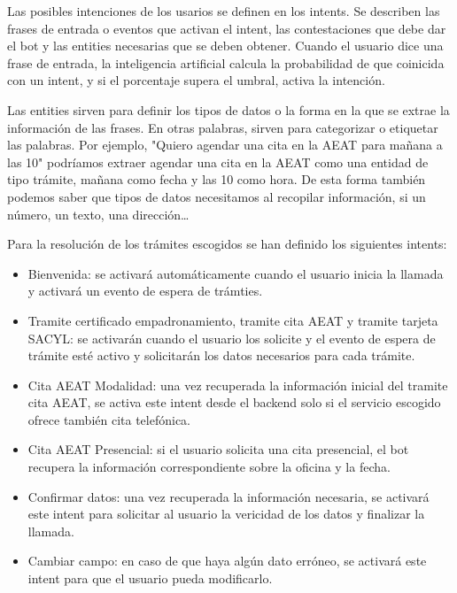 \documentclass[12pt, a4paper, twoside]{report}
\begin{document}
        Las posibles intenciones de los usarios se definen en los intents. 
        Se describen las frases de entrada o eventos que activan el intent, las contestaciones que debe dar el bot y las entities necesarias que se deben obtener. 
        Cuando el usuario dice una frase de entrada, la inteligencia artificial calcula la probabilidad de que coinicida con un intent, y si el porcentaje supera el umbral, activa la intención.
        
        Las entities sirven para definir los tipos de datos o la forma en la que se extrae la información de las frases.
        En otras palabras, sirven para categorizar o etiquetar las palabras. 
        Por ejemplo, "Quiero agendar una cita en la AEAT para mañana a las 10" podríamos extraer agendar una cita en la AEAT como una entidad de tipo trámite, mañana como fecha y las 10 como hora. 
        De esta forma también podemos saber que tipos de datos necesitamos al recopilar información, si un número, un texto, una dirección\dots
        
        Para la resolución de los trámites escogidos se han definido los siguientes intents: 
        \begin{itemize}
            \item Bienvenida: se activará automáticamente cuando el usuario inicia la llamada y activará un evento de espera de trámties.
            \item Tramite certificado empadronamiento, tramite cita AEAT y tramite tarjeta SACYL: se activarán cuando el usuario los solicite y el evento de espera de trámite esté activo y solicitarán los datos necesarios para cada trámite.
            \item Cita AEAT Modalidad: una vez recuperada la información inicial del tramite cita AEAT, se activa este intent desde el backend solo si el servicio escogido ofrece también cita telefónica.
            \item Cita AEAT Presencial: si el usuario solicita una cita presencial, el bot recupera la información correspondiente sobre la oficina y la fecha.
            \item Confirmar datos: una vez recuperada la información necesaria, se activará este intent para solicitar al usuario la vericidad de los datos y finalizar la llamada.
            \item Cambiar campo: en caso de que haya algún dato erróneo, se activará este intent para que el usuario pueda modificarlo.
        \end{itemize}
\end{document}
